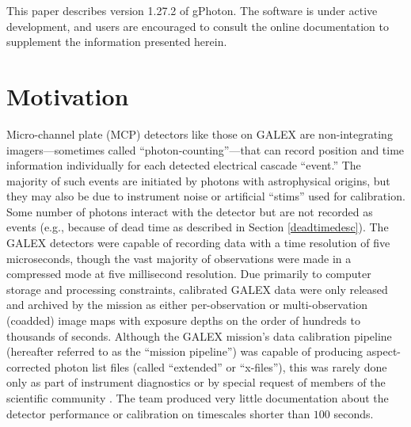 \documentclass[iop]{emulateapj}
\begin{document}
This paper describes version 1.27.2 of gPhoton. The software is under active development, and users are encouraged to consult the online documentation to supplement the information presented herein.

\section{Motivation}
\label{motivation}
Micro-channel plate (MCP) detectors like those on GALEX are non-integrating imagers---sometimes called ``photon-counting''---that can record position and time information individually for each detected electrical cascade ``event.'' The majority of such events are initiated by photons with astrophysical origins, but they may also be due to instrument noise or artificial ``stims'' used for calibration. Some number of photons interact with the detector but are not recorded as events (e.g., because of dead time as described in Section \ref{deadtimedesc}). The GALEX detectors were capable of recording data with a time resolution of five microseconds, though the vast majority of observations were made in a compressed mode at five millisecond resolution. Due primarily to computer storage and processing constraints, calibrated GALEX data were only released and archived by the mission as either per-observation or multi-observation (coadded) image maps with exposure depths on the order of hundreds to thousands of seconds. Although the GALEX mission's data calibration pipeline (hereafter referred to as the ``mission pipeline'') was capable of producing aspect-corrected photon list files (called ``extended'' or ``x-files''), this was rarely done only as part of instrument diagnostics or by special request of members of the scientific community \citep{rob2005, wel2006, wel2007}. The team produced very little documentation about the detector performance or calibration on timescales shorter than $100$ seconds.
\end{document}
